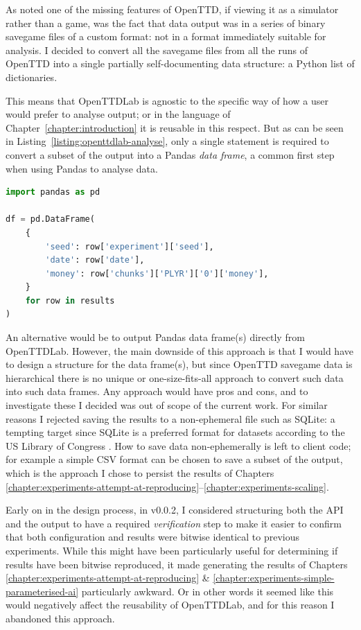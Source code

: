 \documentclass[logo,msc,dsti]{style/infthesis}    %
\begin{document}
{As noted one of the missing features of OpenTTD, if viewing it as a simulator rather than a game, was the fact that data output was in a series of binary savegame files of a custom format: not in a format immediately suitable for analysis. I decided to convert all the savegame files from all the runs of OpenTTD into a single partially self-documenting data structure: a Python list of dictionaries.

This means that OpenTTDLab is agnostic to the specific way of how a user would prefer to analyse output; or in the language of Chapter~\ref{chapter:introduction} it is reusable in this respect. But as can be seen in Listing~\ref{listing:openttdlab-analyse}, only a single statement is required to convert a subset of the output into a Pandas \emph{data frame}, a common first step when using Pandas to analyse data.

\begin{lstlisting}[label=listing:openttdlab-analyse,language=Python, caption={Example usage of the results of OpenTTDLab, such as those generated in \ref{listing:openttdlab}, converting them to a Pandas data frame.}]
import pandas as pd

df = pd.DataFrame(
    {
        'seed': row['experiment']['seed'],
        'date': row['date'],
        'money': row['chunks']['PLYR']['0']['money'],
    }
    for row in results
)
\end{lstlisting}
%
An alternative would be to output Pandas data frame(s) directly from OpenTTDLab. However, the main downside of this approach is that I would have to design a structure for the data frame(s), but since OpenTTD savegame data is hierarchical there is no unique or one-size-fits-all approach to convert such data into such data frames. Any approach would have pros and cons, and to investigate these I decided was out of scope of the current work. For similar reasons I rejected saving the results to a non-ephemeral file such as SQLite: a tempting target since SQLite is a preferred format for datasets according to the US Library of Congress \cite{sqlitelog}. How to save data non-ephemerally is left to client code; for example a simple CSV format can be chosen to save a subset of the output, which is the approach I chose to persist the results of Chapters \ref{chapter:experiments-attempt-at-reproducing}--\ref{chapter:experiments-scaling}.

Early on in the design process, in v0.0.2, I considered structuring both the API and the output to have a required \emph{verification} step to make it easier to confirm that both configuration and results were bitwise identical to previous experiments. While this might have been particularly useful for determining if results have been bitwise reproduced, it made generating the results of Chapters \ref{chapter:experiments-attempt-at-reproducing} \& \ref{chapter:experiments-simple-parameterised-ai} particularly awkward. Or in other words it seemed like this would negatively affect the reusability of OpenTTDLab, and for this reason I abandoned this approach.


}
\end{document}
